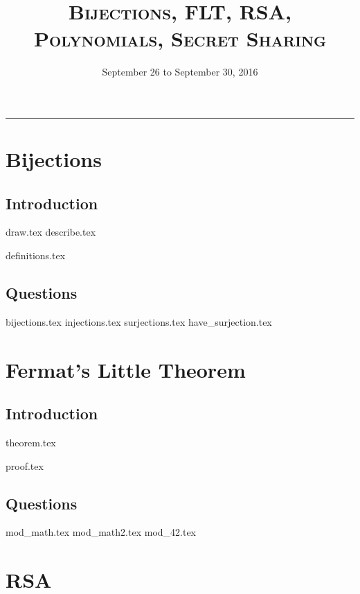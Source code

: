 \documentclass{exam}
\title{\textsc{Bijections, FLT, RSA, Polynomials, Secret Sharing}}
\date{September 26 to September 30, 2016}
\begin{document}
\maketitle
\rule{\textwidth}{0.15em}
\fontsize{12}{15}\selectfont
\thispagestyle{empty}

\section{Bijections}
\subsection{Introduction}
\begin{questions}
{draw.tex}
{describe.tex}
\end{questions}
{definitions.tex}
\subsection{Questions}
\begin{questions}
{bijections.tex}
{injections.tex}
{surjections.tex}
{have_surjection.tex}
\end{questions}

\section{Fermat's Little Theorem}
\subsection{Introduction}
{theorem.tex}
\begin{questions}
{proof.tex}
\end{questions}
\subsection{Questions}
\begin{questions}
{mod_math.tex}
{mod_math2.tex}
{mod_42.tex}
\end{questions}

\section{RSA}
\end{document}
